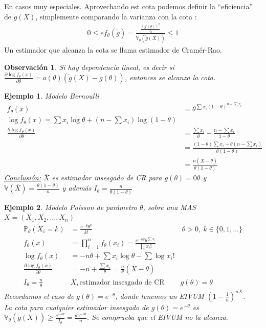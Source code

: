 \documentclass[10pt]{article}
\theoremstyle{plain}
\newtheorem{obs}{Observación}
\newtheorem{ej}{Ejemplo}
\theoremstyle{definition}
\begin{document}
En casos muy especiales. Aprovechando est cota podemos definir la ``eficiencia'' de $\tilde{g}(X)$, simplemente comparando la varianza con la cota :
\begin{align*}
0 \le ef_{\theta}(\tilde{g}) = \frac{\frac{(g'(\theta))^2}{I_{\theta}}}{\mathbb{V}_{\theta}(\tilde{g}(X))} \le 1
\end{align*}
Un estimador que alcanza la cota se llama estimador de Cramér-Rao.

\begin{obs}
Si hay dependencia lineal, es decir si $\frac{\partial \log f_{\theta}(x)}{\partial \theta} = a(\theta)(\tilde{g}(X)-g(\theta))$, entonces se alcanza la cota.
\end{obs}

\begin{ej} Modelo Bernoulli\\
\begin{align*}
f_{\theta}(x) &= \theta^{\sum{x_{i}}(1-\theta)^{n-\sum{x_{i}}}}\\
\log f_{\theta}(x) = \sum x_{i} \log{\theta} + (n-\sum{x_{i}})\log{(1-\theta)}\\
\frac{\partial \log f_{\theta}(x)}{\partial \theta} &= \frac{\sum x_{i}}{\theta} - \frac{n-\sum{x_{i}}}{1-\theta}\\
&= \frac{(1-\theta)\sum{x_{i}}-\theta (n-\sum{x_{i}})}{\theta (1-\theta)}\\
&= \frac{n(\overline{X}-\theta)}{\theta (1-\theta)}
\end{align*}
\underline{Conclusión:} $\overline{X}$ es estimador insesgado de CR para $g(\theta)= 0 \theta$ y $\mathbb{V}(\overline{X}) = \frac{\theta (1-\theta)}{n}$ y además $I_{\theta} = \frac{n}{\theta (1-\theta)}$
\end{ej}

\begin{ej} Modelo Poisson de parámetro $\theta$, sobre una MAS $X=(X_{1},X_{2},\ldots,X_{n})$\\
\begin{align*}
\mathbb{P}_{\theta}(X_{i}=k) &= \frac{e^{-\theta}\theta^{k}}{k!} &\ \theta >0,\ k\in \{0,1,\ldots\}\\
f_{\theta}(x) &= \prod_{i=1}^n f_{\theta}(x_{i}) = \frac{e^{-n\theta}\theta^{\sum x_{i}}}{\prod x_{i}!}&\\
\log f_{\theta}(x) &= -n\theta + \sum x_{i} \log \theta - \sum{\log x_{i}!}&\\
\frac{\partial \log f_{\theta}(x)}{\partial \theta} &= -n + \frac{\sum x_{i}}{\theta} = \frac{n}{\theta}(\overline{X}-\theta)\\
I_{\theta} = \frac{n}{\theta} & \overline{X}, \text{estimador insesgado de CR} & g(\theta) = \theta
\end{align*}
Recordamos el caso de $g(\theta) = e^{-\theta}$, donde tenemos un EIVUM $\left(1-\frac{1}{n}\right)^{n\overline{X}}$.\\
La cota para cualquier estimador insesgado de $g(\theta) = e^{-\theta}$ es $\mathbb{V}_{\theta}(\tilde{g}(X)) \ge \frac{e^{-2\theta}}{I_{\theta}} = \frac{\theta e^{-2\theta}}{n}$. Se comprueba que el EIVUM no la alcanza.
\end{ej}
\end{document}
